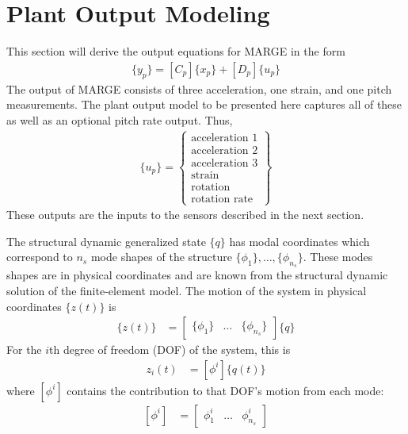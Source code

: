 \section{Plant Output Modeling} %

This section will derive the output equations for MARGE in the form
\begin{align}
	\{y_p\} = [C_p]\{x_p\}+[D_p]\{u_p\}
\end{align}
The output of MARGE consists of three acceleration, one strain, and one pitch measurements. The plant output model to be presented here captures all of these as well as an optional pitch rate output. Thus,
\begin{align}
	\{u_p\} = \begin{Bmatrix}
		\text{acceleration 1} \\
		\text{acceleration 2} \\
		\text{acceleration 3} \\
		\text{strain} \\
		\text{rotation} \\
		\text{rotation rate}
	\end{Bmatrix}
\end{align}
These outputs are the inputs to the sensors described in the next section.

The structural dynamic generalized state $\{q\}$ has modal coordinates which correspond to $n_s$ mode shapes of the structure $\{\phi_1\}, \dots, \{\phi_{n_s}\}$. These modes shapes are in physical coordinates and are known from the structural dynamic solution of the finite-element model. The motion of the system in physical coordinates $\{z(t)\}$ is
\begin{align}
	\{z(t)\} &= \begin{bmatrix} \{\phi_1\} & \dots & \{\phi_{n_s}\} \end{bmatrix} \{q\}
\end{align}
For the $i$th degree of freedom (DOF) of the system, this is
\begin{align}
	z_i(t) &= \left[ \phi^i \right] \{q(t)\}
\end{align}
where $\left[ \phi^i \right]$ contains the contribution to that DOF's motion from each mode:
\begin{align}
	\left[ \phi^i \right] &= \begin{bmatrix} \phi_1^i & \dots & \phi_{n_s}^i \end{bmatrix}
\end{align}

